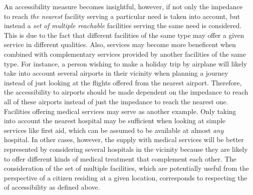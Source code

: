 An accessibility measure becomes insightful, however, if not only the impedance to reach \emph{the nearest} facility 
serving a particular need is taken into account, but instead a \emph{set of multiple reachable} facilities serving the same 
need is considered. This is due to the fact that different facilities of the same type may offer a given service in 
different qualities. Also, services may become more beneficent when combined with complementary services provided by 
another facilities of the same type. For instance, a person wishing to make a holiday trip by airplane will likely 
take into account several airports in their vicinity when planning a journey instead of just looking at the flights 
offered from the nearest airport. Therefore, the accessibility to airports should be made dependent on the impedance 
to reach all of these airports instead of just the impedance to reach the nearest one. Facilities offering medical 
services may serve as another example. Only taking into account the nearest hospital may be sufficient when looking 
at simple services like first aid, which can be assumed to be available at almost \emph{any} hospital. In other cases, 
however, the supply with medical services will be better represented by considering several hospitals in the vicinity 
because they are likely to offer different kinds of medical treatment that complement each other. 
The consideration of the set of multiple facilities, which are potentially useful from the perspective of a citizen residing
at a given location, corresponds to respecting the  of accessibility as defined above.

